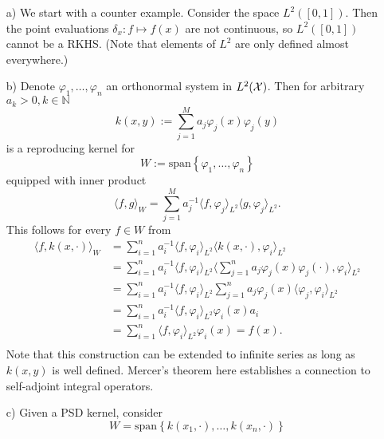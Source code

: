 \begin{example}[RKHS]
\begin{itemize}
	\item[a)] We start with a counter example. Consider the space $L^2([0, 1])$. Then the point evaluations $\delta_x: f \mapsto f(x)$ are not continuous, so $L^2([0, 1])$ cannot be a RKHS. (Note that elements of $L^2$ are only defined almost everywhere.)
	\item[b)] Denote $\varphi_1, \ldots, \varphi_n$ an orthonormal system in $L^2(\mathcal{X})$. Then for arbitrary $a_k > 0, k \in \mathbb{N}$
	\begin{equation}
		k(x, y) := \sum_{j=1}^M a_j \varphi_j(x)\varphi_j(y)
	\end{equation}
	is a reproducing kernel for 
	\begin{equation*}
		W := \mathrm{span}\left\{\varphi_1, \ldots, \varphi_n\right\}
	\end{equation*}
	equipped with inner product 
	\begin{equation*}
		\langle f, g \rangle_W = \sum_{j=1}^M a_j^{-1} \langle f, \varphi_j \rangle_{L^2} \langle g, \varphi_j \rangle_{L^2}.
	\end{equation*}
	This follows for every $f \in W$ from
	\begin{align*}
		\langle f, k(x, \cdot ) \rangle_W &= \sum_{i=1}^n a_i^{-1} \langle f, \varphi_i \rangle_{L^2} \langle k(x, \cdot ), \varphi_i \rangle_{L^2} \\
		& = \sum_{i=1}^n a_i^{-1} \langle f, \varphi_i \rangle_{L^2} \langle \sum_{j=1}^n a_j \varphi_j(x)\varphi_j(\cdot), \varphi_i \rangle_{L^2} \\
		& = \sum_{i=1}^n a_i^{-1} \langle f, \varphi_i \rangle_{L^2} \sum_{j=1}^n a_j \varphi_j(x)\langle \varphi_j, \varphi_i \rangle_{L^2} \\
		& = \sum_{i=1}^n a_i^{-1} \langle f, \varphi_i \rangle_{L^2} \varphi_i(x) a_i \\
		& = \sum_{i=1}^n \langle f, \varphi_i \rangle_{L^2} \varphi_i(x) = f(x). \\
	\end{align*}
	Note that this construction can be extended to infinite series as long as $k(x, y)$ is well defined. Mercer's theorem here establishes a connection to self-adjoint integral operators.
	\item[c)] Given a PSD kernel, consider 
	\begin{equation*}
			W = \mathrm{span}\left\{k(x_1, \cdot), \ldots, k(x_n, \cdot)\right\}
	\end{equation*}

\end{itemize}
\end{example}

